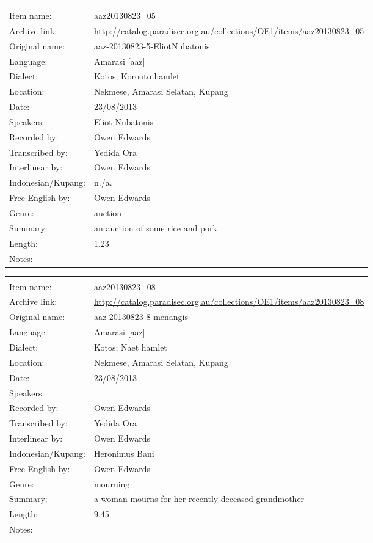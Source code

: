 \newpage
\noindent
\wg\begin{tabular}{lL{.67\textwidth}}
			& \\
Item name:			& aaz20130823{\_}05\\
Archive link:			& \url{http://catalog.paradisec.org.au/collections/OE1/items/aaz20130823_05}\\
Original name:			& aaz-20130823-5-EliotNubatonis\\
Language:				& Amarasi [aaz] \\
Dialect:				& Kotos; Koro{\Q}oto hamlet \\
Location:				& Nekmese{\Q}, Amarasi Selatan, Kupang \\
Date:				& 23/08/2013\\
Speakers:				& Eliot Nubatonis\\
Recorded by:			& Owen Edwards\\
Transcribed by:		& Yedida Ora\\
Interlinear by:		& Owen Edwards \\
Indonesian/Kupang:		& n./a.\\
Free English by:		& Owen Edwards\\
Genre:				& auction\\
Summary:				& an auction of some rice and pork\\
Length:				& 1.23\\
Notes:				& \\
\end{tabular}

\newpage
\noindent
\wg\begin{tabular}{lL{.67\textwidth}}
			& \\
Item name:			& aaz20130823{\_}08\\
Archive link:			& \url{http://catalog.paradisec.org.au/collections/OE1/items/aaz20130823_08}\\
Original name:			& aaz-20130823-8-menangis\\
Language:				& Amarasi [aaz] \\
Dialect:				& Kotos; Naet hamlet \\
Location:				& Nekmese{\Q}, Amarasi Selatan, Kupang \\
Date:				& 23/08/2013\\
Speakers:				& \\
Recorded by:			& Owen Edwards\\
Transcribed by:		& Yedida Ora\\
Interlinear by:		& Owen Edwards \\
Indonesian/Kupang:		& Heronimus Bani\\
Free English by:		& Owen Edwards\\
Genre:				& mourning\\
Summary:				& a woman mourns for her recently deceased grandmother\\
Length:				& 9.45\\
Notes:				& \\
\end{tabular}

